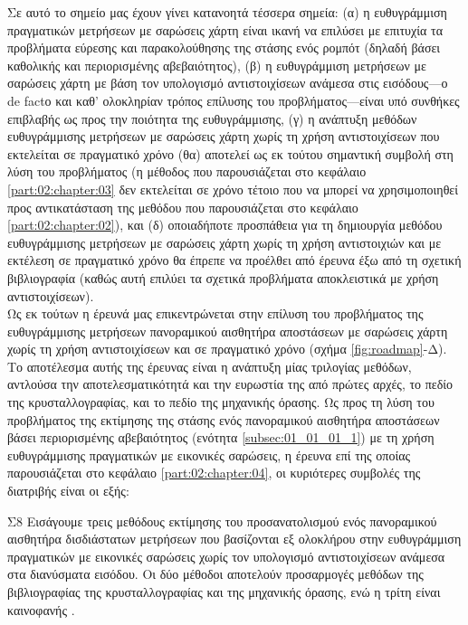 Σε αυτό το σημείο μας έχουν γίνει κατανοητά τέσσερα σημεία: (α) η ευθυγράμμιση
πραγματικών μετρήσεων με σαρώσεις χάρτη είναι ικανή να επιλύσει με επιτυχία τα
προβλήματα εύρεσης και παρακολούθησης της στάσης ενός ρομπότ (δηλαδή βάσει
καθολικής και περιορισμένης αβεβαιότητος), (β) η ευθυγράμμιση μετρήσεων με
σαρώσεις χάρτη με βάση τον υπολογισμό αντιστοιχίσεων ανάμεσα στις εισόδους---ο
de factο και καθ' ολοκληρίαν τρόπος επίλυσης του προβλήματος---είναι υπό
συνθήκες επιβλαβής ως προς την ποιότητα της ευθυγράμμισης, (γ) η ανάπτυξη
μεθόδων ευθυγράμμισης μετρήσεων με σαρώσεις χάρτη χωρίς τη χρήση αντιστοιχίσεων
που εκτελείται σε πραγματικό χρόνο (θα) αποτελεί ως εκ τούτου σημαντική συμβολή
στη λύση του προβλήματος (η μέθοδος που παρουσιάζεται στο κεφάλαιο
\ref{part:02:chapter:03} δεν εκτελείται σε χρόνο τέτοιο που να μπορεί να
χρησιμοποιηθεί προς αντικατάσταση της μεθόδου που παρουσιάζεται στο κεφάλαιο
\ref{part:02:chapter:02}), και (δ) οποιαδήποτε προσπάθεια για τη δημιουργία
μεθόδου ευθυγράμμισης μετρήσεων με σαρώσεις χάρτη χωρίς τη χρήση αντιστοιχιών
και με εκτέλεση σε πραγματικό χρόνο θα έπρεπε να προέλθει από έρευνα έξω από τη
σχετική βιβλιογραφία (καθώς αυτή επιλύει τα σχετικά προβλήματα αποκλειστικά
με χρήση αντιστοιχίσεων).\\



Ως εκ τούτων η έρευνά μας επικεντρώνεται στην επίλυση του προβλήματος της
ευθυγράμμισης μετρήσεων πανοραμικού αισθητήρα αποστάσεων με σαρώσεις χάρτη
χωρίς τη χρήση αντιστοιχίσεων και σε πραγματικό χρόνο (σχήμα
\ref{fig:roadmap}-Δ). Το αποτέλεσμα αυτής της έρευνας είναι η ανάπτυξη μίας
τριλογίας μεθόδων, αντλούσα την αποτελεσματικότητά και την ευρωστία της από
πρώτες αρχές, το πεδίο της κρυσταλλογραφίας, και το πεδίο της μηχανικής όρασης.
Ως προς τη λύση του προβλήματος της εκτίμησης της στάσης ενός πανοραμικού
αισθητήρα αποστάσεων βάσει περιορισμένης αβεβαιότητος (ενότητα
\ref{subsec:01_01_01_1}) με τη χρήση ευθυγράμμισης πραγματικών με εικονικές
σαρώσεις, η έρευνα επί της οποίας παρουσιάζεται στο κεφάλαιο
\ref{part:02:chapter:04}, οι κυριότερες συμβολές της διατριβής είναι οι εξής:

\begin{bw_box}
\begin{customcontribution}{Σ8}
  \label{contribution:08}
  Εισάγουμε τρεις μεθόδους εκτίμησης του προσανατολισμού ενός πανοραμικού
  αισθητήρα δισδιάστατων μετρήσεων που βασίζονται εξ ολοκλήρου στην
  ευθυγράμμιση πραγματικών με εικονικές σαρώσεις χωρίς τον υπολογισμό
  αντιστοιχίσεων ανάμεσα στα διανύσματα εισόδου. Οι δύο μέθοδοι αποτελούν
  προσαρμογές μεθόδων της βιβλιογραφίας της κρυσταλλογραφίας και της
  μηχανικής όρασης, ενώ η τρίτη είναι καινοφανής \cite{Filotheou2023}.
\end{customcontribution}
\end{bw_box}

